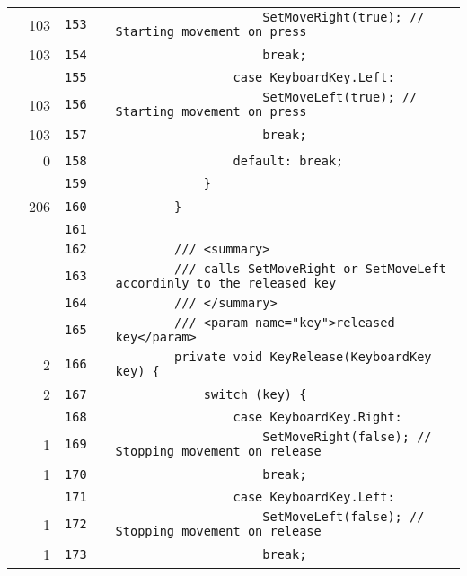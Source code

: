\documentclass[a4paper,landscape,10pt]{article}
\begin{document}
\begin{longtable}[l]{lrrll}
\cellcolor{green} & 103 & \verb~153~ & & \verb~                    SetMoveRight(true); // Starting movement on press~\\
\cellcolor{green} & 103 & \verb~154~ & & \verb~                    break;~\\
\cellcolor{gray} &  & \verb~155~ & & \verb~                case KeyboardKey.Left:~\\
\cellcolor{green} & 103 & \verb~156~ & & \verb~                    SetMoveLeft(true); // Starting movement on press~\\
\cellcolor{green} & 103 & \verb~157~ & & \verb~                    break;~\\
\cellcolor{red} & 0 & \verb~158~ & & \verb~                default: break;~\\
\cellcolor{gray} &  & \verb~159~ & & \verb~            }~\\
\cellcolor{green} & 206 & \verb~160~ & & \verb~        }~\\
\cellcolor{gray} &  & \verb~161~ & & \verb~~\\
\cellcolor{gray} &  & \verb~162~ & & \verb~        /// <summary>~\\
\cellcolor{gray} &  & \verb~163~ & & \verb~        /// calls SetMoveRight or SetMoveLeft accordinly to the released key~\\
\cellcolor{gray} &  & \verb~164~ & & \verb~        /// </summary>~\\
\cellcolor{gray} &  & \verb~165~ & & \verb~        /// <param name="key">released key</param>~\\
\cellcolor{green} & 2 & \verb~166~ & & \verb~        private void KeyRelease(KeyboardKey key) {~\\
\cellcolor{green} & 2 & \verb~167~ & & \verb~            switch (key) {~\\
\cellcolor{gray} &  & \verb~168~ & & \verb~                case KeyboardKey.Right:~\\
\cellcolor{green} & 1 & \verb~169~ & & \verb~                    SetMoveRight(false); // Stopping movement on release~\\
\cellcolor{green} & 1 & \verb~170~ & & \verb~                    break;~\\
\cellcolor{gray} &  & \verb~171~ & & \verb~                case KeyboardKey.Left:~\\
\cellcolor{green} & 1 & \verb~172~ & & \verb~                    SetMoveLeft(false); // Stopping movement on release~\\
\cellcolor{green} & 1 & \verb~173~ & & \verb~                    break;~\\

\end{longtable}
\end{document}
